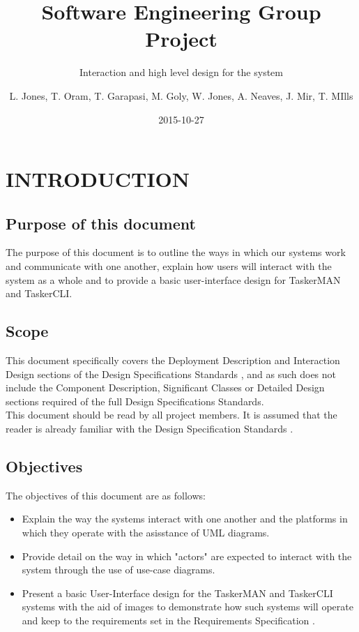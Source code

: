 \documentclass{project}
\begin{document}
\title{Software Engineering Group Project}
\subtitle{Interaction and high level design for the system}
\author{L. Jones, T. Oram, T. Garapasi, M. Goly, W. Jones, A. Neaves, J. Mir, T. MIlls}     
\date{2015-10-27}
\maketitle
\tableofcontents
\newpage
\section{INTRODUCTION}
\subsection{Purpose of this document}
The purpose of this document is to outline the ways in which our systems work and communicate with one another, explain how users will interact with the system as a whole and to provide a basic user-interface design for TaskerMAN and TaskerCLI.
\subsection{Scope}
This document specifically covers the Deployment Description and Interaction Design sections of the Design Specifications Standards \cite{se.qa.ds}, and as such does not include the Component Description, Significant Classes or Detailed Design sections required of the full Design Specifications Standards.\\
\newline
This document should be read by all project members. It is assumed that the reader is already familiar with the Design Specification Standards \cite{se.qa.ds}.
\subsection{Objectives}
The objectives of this document are as follows:
\begin{itemize}
	\item Explain the way the systems interact with one another and the platforms in which they operate with the asisstance of UML diagrams.
	\item Provide detail on the way in which "actors" are expected to interact with the system through the use of use-case diagrams.
	\item Present a basic User-Interface design for the TaskerMAN and TaskerCLI systems with the aid of images to demonstrate how such systems will operate and keep to the requirements set in the Requirements Specification \cite{se.qa.rs}.
\end{itemize} 
\clearpage
\end{document}
